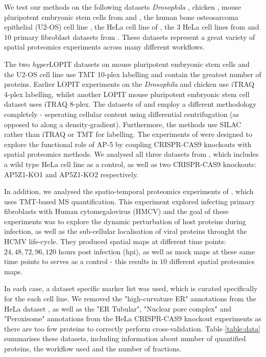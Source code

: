 \documentclass[12pt,english]{article}\usepackage[]{graphicx}\usepackage[]{color}
\begin{document}
We test our methods on the following datasets  \textit{Drosophila}
\citep{Tan:2009}, chicken \citep{hall:2009}, mouse pluripotent embryonic stem cells
from \cite{hyper} and \cite{Breckels:2016}, the human bone osteosarcoma epithelial
(U2-OS) cell line \citep{Thul:2017}, the HeLa cell line of
\cite{Itzhak:2016}, the $3$ HeLa cell lines from \cite{Hirst:2018} and $10$ primary
fibroblast datasets from \cite{Jean_Beltran:2016}.
These datasets represent a great variety of spatial proteomics experiments across many different
workflows.

The two \textit{hyper}LOPIT datasets on mouse pluripotent embryonic stem cells
and the U2-OS cell line use TMT 10-plex labelling and contain the greatest number of proteins.
Earlier LOPIT experiments on the \textit{Drosophila} and chicken use iTRAQ 4-plex labelling,
whilst another LOPIT mouse pluripotent embryonic stem cell dataset uses iTRAQ 8-plex. The datasets
of \cite{Itzhak:2016} and \cite{Hirst:2018} employ a different methodology completely -
seperating cellular content using differential centrifugation (as opposed to along a density-gradient).
Furthermore, the methods use SILAC rather than iTRAQ or TMT for labelling. The experiments of
\cite{Hirst:2018} were designed to explore the functional role of AP-5 by coupling CRISPR-CAS9 knockouts with
spatial proteomics methods. We analysed all three datasets from \cite{Hirst:2018}, which includes a
wild type HeLa cell line as a control, as well as two CRISPR-CAS9 knockouts: AP5Z1-KO1 and AP5Z1-KO2 respectively.

In addition, we analysed the spatio-temporal proteomics experiments of \cite{Jean_Beltran:2016},
which uses TMT-based MS quantification. This experiment explored infecting primary fibroblasts with Human cytomegalovirus (HMCV) and the
goal of these experiments was to explore the dynamic perturbation of host proteins during infection, as well as
the sub-cellular localisation of viral proteins throught the HCMV life-cycle. They produced spatial maps
at different time points: $24,48,72,96,120$ hours post infection (hpi), as well as mock
maps at these same time points to serves as a control - this results in $10$ different spatial proteomics
maps.

In each case, a dataset specific marker list was used, which is curated
specifically for the each cell line. We removed the "high-curvature ER" annotations
from the HeLa dataset \citep{Itzhak:2016}, as well as the "ER Tubular", "Nuclear pore complex" and "Peroxisome"
annotations from the HeLa CRISPR-CAS9 knockout experiments \citep{Hirst:2018} as there are too few proteins
to correctly perform cross-validation. Table \ref{table:data} summarises these datasets, including
information about number of quantified proteins, the workflow used and the number of fractions.
\end{document}
